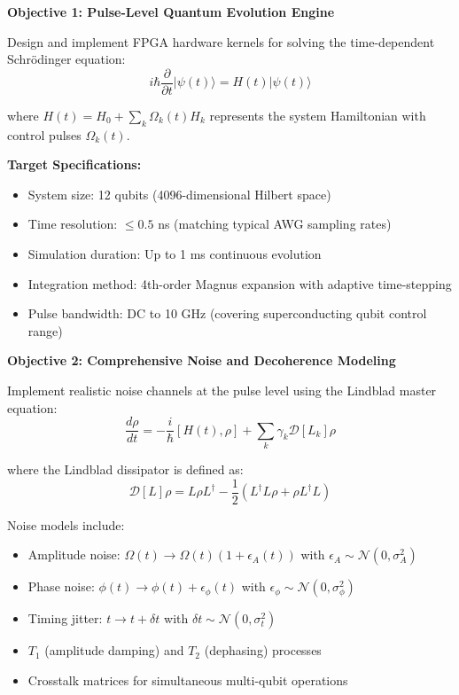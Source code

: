 \documentclass[12pt,a4paper]{article}
\begin{document}
\textbf{Objective 1: Pulse-Level Quantum Evolution Engine}

Design and implement FPGA hardware kernels for solving the time-dependent Schrödinger equation:
\begin{equation}
i\hbar \frac{\partial}{\partial t}|\psi(t)\rangle = H(t)|\psi(t)\rangle
\label{eq:schrodinger}
\end{equation}

where $H(t) = H_0 + \sum_k \Omega_k(t) H_k$ represents the system Hamiltonian with control pulses $\Omega_k(t)$.

\textbf{Target Specifications:}
\begin{itemize}[noitemsep]
    \item System size: 12 qubits (4096-dimensional Hilbert space)
    \item Time resolution: $\leq 0.5$ ns (matching typical AWG sampling rates)
    \item Simulation duration: Up to 1 ms continuous evolution
    \item Integration method: 4th-order Magnus expansion with adaptive time-stepping
    \item Pulse bandwidth: DC to 10 GHz (covering superconducting qubit control range)
\end{itemize}

\textbf{Objective 2: Comprehensive Noise and Decoherence Modeling}

Implement realistic noise channels at the pulse level using the Lindblad master equation:
\begin{equation}
\frac{d\rho}{dt} = -\frac{i}{\hbar}[H(t), \rho] + \sum_k \gamma_k \mathcal{D}[L_k]\rho
\label{eq:lindblad}
\end{equation}

where the Lindblad dissipator is defined as:
\begin{equation}
\mathcal{D}[L]\rho = L\rho L^\dagger - \frac{1}{2}\left(L^\dagger L\rho + \rho L^\dagger L\right)
\label{eq:dissipator}
\end{equation}

Noise models include:
\begin{itemize}[noitemsep]
    \item Amplitude noise: $\Omega(t) \rightarrow \Omega(t)(1 + \epsilon_A(t))$ with $\epsilon_A \sim \mathcal{N}(0, \sigma_A^2)$
    \item Phase noise: $\phi(t) \rightarrow \phi(t) + \epsilon_\phi(t)$ with $\epsilon_\phi \sim \mathcal{N}(0, \sigma_\phi^2)$
    \item Timing jitter: $t \rightarrow t + \delta t$ with $\delta t \sim \mathcal{N}(0, \sigma_t^2)$
    \item $T_1$ (amplitude damping) and $T_2$ (dephasing) processes
    \item Crosstalk matrices for simultaneous multi-qubit operations
\end{itemize}
\end{document}
